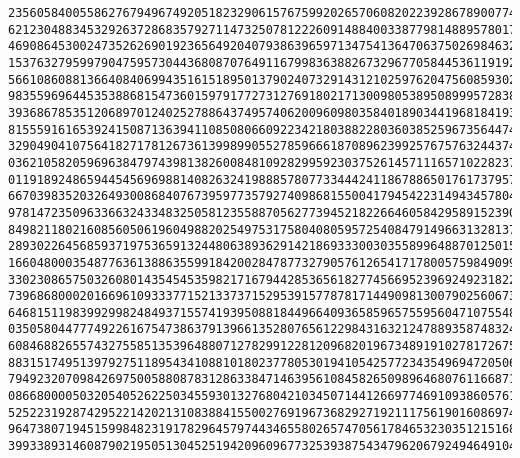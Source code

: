 \documentclass{article}
\begin{document}
\begin{verbatim}
235605840055862767949674920518232906157675992026570608202239286789007746016169080313213468194221
621230488345329263728683579271147325078122260914884003387798148895780178796702100392626852151788
469086453002473526269019236564920407938639659713475413647063750269846327136857275159848954971081
153763279599790475957304436808707649116799836388267329677058445361191929352326458850406160180695
566108608813664084069943516151895013790240732914312102597620475608593022070256915066596555685121
983559696445353886815473601597917727312769180217130098053895089995728380356628473350978730771719
393686785351206897012402527886437495740620096098035840189034419681841936644266556523330400098916
815559161653924150871363941108508066092234218038822803603852596735644742670505804776631639355024
329049041075641827178126736139989905527859666187089623992576757632443744571189164468867332822121
036210582059696384797439813826008481092829959230375261457111657102282377946095075283547039152013
011918924865944545696988140826324198885780773344424118678865017617379573811127853804866408923111
667039835203264930086840767395977357927409868155004179454223149434578043999353570953409837286275
978147235096336632433483250581235588705627739452182266460584295891523904679809831298124820425398
849821180216085605061960498820254975317580408059572540847914966313281375193667910286346063520135
289302264568593719753659132448063893629142186933300303558996488701250159858462795487377854575970
166048000354877636138863559918420028478773279057612654171780057598490999201252972350431650214903
330230865750326080143545453598217167944285365618277456695239692492318229476543308498886869717162
739686800020166961093337715213373715295391577878171449098130079025606733038274835719366751557529
646815119839929982484937155741939508818449664093658596575595604710755484909405669341919868428482
035058044777492261675473863791396613528076561229843163212478893587483243521582151676334657165277
608468826557432755851353964880712782991228120968201967348919102781726754872146792628509816384777
883151749513979275118954341088101802377805301941054257723435496947205068015727380750283421103246
794923207098426975005880878312863384714639561084582650989646807611668714322126551667518744942716
086680000503205405262250345593013276804210345071441266977469109386057619304491930284080063250608
525223192874295221420213108388415500276919673682927192111756190160869743859283545095378166716843
964738071945159984823191782964579744346558026574705617846532303512151689057873790562325210437128
399338931460879021950513045251942096096773253938754347962067924946491047388222467585877012326051

\end{verbatim}
\end{document}
